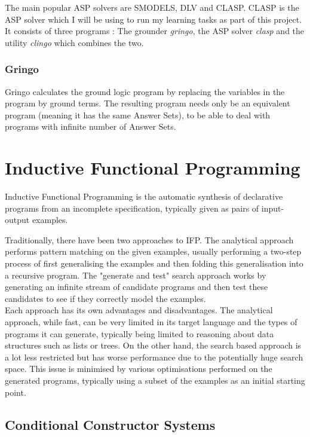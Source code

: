 The main popular ASP solvers are SMODELS, DLV and CLASP. CLASP is the ASP solver which I will be using to run my learning tasks as part of this project. It consists of three programs : The grounder \textit{gringo}, the ASP solver \textit{clasp} and the utility \textit{clingo} which combines the two.

\subsubsection{Gringo}

Gringo calculates the ground logic program by replacing the variables in the program by ground terms. The resulting program needs only be an equivalent program (meaning it has the same Answer Sets), to be able to deal with programs with infinite number of Answer Sets.

\section{Inductive Functional Programming}

Inductive Functional Programming is the automatic synthesis of declarative programs from an incomplete specification, typically given as pairs of input-output examples.

Traditionally, there have been two approaches to IFP. The analytical approach performs pattern matching on the given examples, usually performing a two-step process of first generalising the examples and then folding this generalisation into a recursive program. The "generate and test" search approach works by generating an infinite stream of candidate programs and then test these candidates to see if they correctly model the examples. \\

Each approach has its own advantages and disadvantages. The analytical approach, while fast, can be very limited in its target language and the types of programs it can generate, typically being limited to reasoning about data structures such as lists or trees. On the other hand, the search based approach is a lot less restricted but has worse performance due to the potentially huge search space. This issue is minimised by various optimisations performed on the generated programs, typically using a subset of the examples as an initial starting point.

\subsection{Conditional Constructor Systems}

